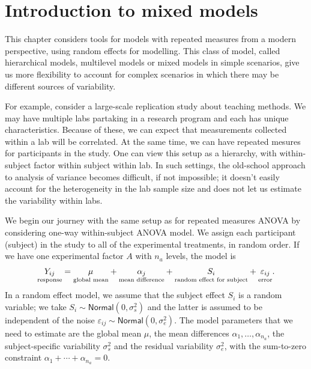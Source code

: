\documentclass[
  11pt,
  letterpaper,
]{scrbook}
\theoremstyle{definition}
\theoremstyle{definition}
\theoremstyle{remark}
\begin{document}

\chapter{Introduction to mixed
models}\label{introduction-to-mixed-models}

This chapter considers tools for models with repeated measures from a
modern perspective, using random effects for modelling. This class of
model, called hierarchical models, multilevel models or mixed models in
simple scenarios, give us more flexibility to account for complex
scenarios in which there may be different sources of variability.

For example, consider a large-scale replication study about teaching
methods. We may have multiple labs partaking in a research program and
each has unique characteristics. Because of these, we can expect that
measurements collected within a lab will be correlated. At the same
time, we can have repeated mesures for participants in the study. One
can view this setup as a hierarchy, with within-subject factor within
subject within lab. In such settings, the old-school approach to
analysis of variance becomes difficult, if not impossible; it doesn't
easily account for the heterogeneity in the lab sample size and does not
let us estimate the variability within labs.

We begin our journey with the same setup as for repeated measures ANOVA
by considering one-way within-subject ANOVA model. We assign each
participant (subject) in the study to all of the experimental
treatments, in random order. If we have one experimental factor \(A\)
with \(n_a\) levels, the model is
\begin{align*}\underset{\text{response}\vphantom{l}}{Y_{ij}} = \underset{\text{global mean}}{\mu_{\vphantom{j}}} + \underset{\text{mean difference}}{\alpha_j} + \underset{\text{random effect for subject}}{S_{i\vphantom{j}}} + \underset{\text{error}\vphantom{l}}{\varepsilon_{ij}}.
\end{align*} In a random effect model, we assume that the subject effect
\(S_i\) is a random variable; we take
\(S_i \sim \mathsf{Normal}(0, \sigma^2_s)\) and the latter is assumed to
be independent of the noise
\(\varepsilon_{ij} \sim \mathsf{Normal}(0, \sigma^2_e)\). The model
parameters that we need to estimate are the global mean \(\mu\), the
mean differences \(\alpha_1, \ldots, \alpha_{n_a}\), the
subject-specific variability \(\sigma^2_s\) and the residual variability
\(\sigma^2_e\), with the sum-to-zero constraint
\(\alpha_1 + \cdots + \alpha_{n_a}=0\).
\end{document}
